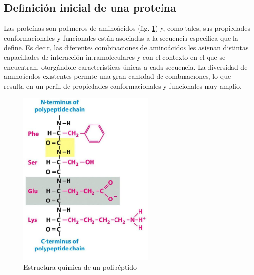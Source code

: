 \subsection{Definición inicial de una proteína}
Las proteínas son polímeros de aminoácidos (fig. \ref{polipeptidoEstructura}) y, como tales, sus propiedades conformacionales y funcionales están asociadas a la secuencia especifica que la define.
Es decir, las diferentes combinaciones de aminoácidos les asignan distintas capacidades de interacción intramoleculares y con el contexto en el que se encuentran, otorgándole características únicas a cada secuencia.
La diversidad de aminoácidos existentes permite una gran cantidad de combinaciones, lo que resulta en un perfil de propiedades conformacionales y funcionales muy amplio.

\begin{figure}[htbp,centered]
\centering
\includegraphics[width=0.6\textwidth]{img/polipeptidoStructure.jpg} 
\caption{Estructura química de un polipéptido} 
\label{polipeptidoEstructura}
\end{figure}



